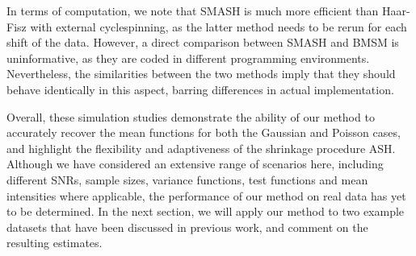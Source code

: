 \documentclass[12pt]{article}
\begin{document}
In terms of computation, we note that SMASH is much more efficient than Haar-Fisz with external cyclespinning, as the latter method needs to be rerun for each shift of the data. However, a direct comparison between SMASH and BMSM is uninformative, as they are coded in different programming environments. Nevertheless, the similarities between the two methods imply that they should behave identically in this aspect, barring differences in actual implementation.

Overall, these simulation studies demonstrate the ability of our method to accurately recover the mean functions for both the Gaussian and Poisson cases, and highlight the flexibility and adaptiveness of the shrinkage procedure ASH. Although we have considered an extensive range of scenarios here, including different SNRs, sample sizes, variance functions, test functions and mean intensities where applicable, the performance of our method on real data has yet to be determined. In the next section, we will apply our method to two example datasets that have been discussed in previous work, and comment on the resulting estimates.
\end{document}
